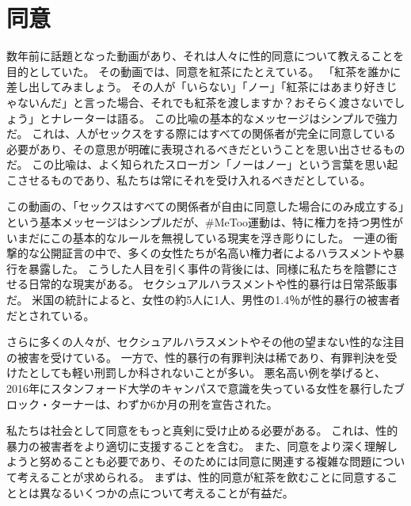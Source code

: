 \documentclass[paper=a4,book,openany]{jlreq}
\begin{document}
\chapter{同意}

数年前に話題となった動画があり、それは人々に性的同意について教えることを目的としていた。
その動画では、同意を紅茶にたとえている。
「紅茶を誰かに差し出してみましょう。
その人が「いらない」「ノー」「紅茶にはあまり好きじゃないんだ」と言った場合、それでも紅茶を渡しますか？おそらく渡さないでしょう」とナレーターは語る。
この比喩の基本的なメッセージはシンプルで強力だ。
これは、人がセックスをする際にはすべての関係者が完全に同意している必要があり、その意思が明確に表現されるべきだということを思い出させるものだ。
この比喩は、よく知られたスローガン「ノーはノー」という言葉を思い起こさせるものであり、私たちは常にそれを受け入れるべきだとしている\citep{may15:_consen}。

この動画の、「セックスはすべての関係者が自由に同意した場合にのみ成立する」という基本メッセージはシンプルだが、\#MeToo運動は、特に権力を持つ男性がいまだにこの基本的なルールを無視している現実を浮き彫りにした。
一連の衝撃的な公開証言の中で、多くの女性たちが名高い権力者によるハラスメントや暴行を暴露した。
こうした人目を引く事件の背後には、同様に私たちを陰鬱にさせる日常的な現実がある。
セクシュアルハラスメントや性的暴行は日常茶飯事だ。
米国の統計によると、女性の約5人に1人、男性の1.4％が性的暴行の被害者だとされている\citep{black11:_nation_intim_partn_sexual_violen_survey}。

さらに多くの人々が、セクシュアルハラスメントやその他の望まない性的な注目の被害を受けている。
一方で、性的暴行の有罪判決は稀であり、有罪判決を受けたとしても軽い刑罰しか科されないことが多い。
悪名高い例を挙げると、2016年にスタンフォード大学のキャンパスで意識を失っている女性を暴行したブロック・ターナーは、わずか6か月の刑を宣告された\citep{stack16:_light_senten_brock}。

私たちは社会として同意をもっと真剣に受け止める必要がある。
これは、性的暴力の被害者をより適切に支援することを含む。
また、同意をより深く理解しようと努めることも必要であり、そのためには同意に関連する複雑な問題について考えることが求められる。
まずは、性的同意が紅茶を飲むことに同意することとは異なるいくつかの点について考えることが有益だ。
\end{document}
